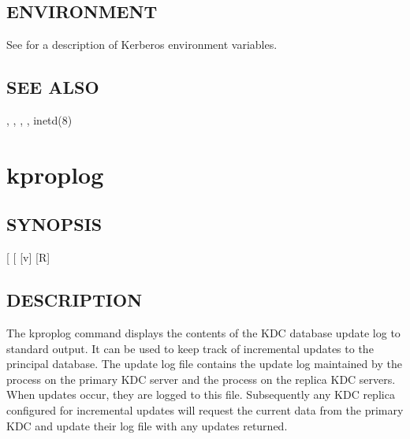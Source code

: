 \documentclass[letterpaper,10pt,english]{sphinxmanual}
\begin{document}
\subsection{ENVIRONMENT}
\label{\detokenize{admin/admin_commands/kpropd:environment}}
\sphinxAtStartPar
See  for a description of Kerberos environment
variables.


\subsection{SEE ALSO}
\label{\detokenize{admin/admin_commands/kpropd:see-also}}
\sphinxAtStartPar
{\hyperref[\detokenize{admin/admin_commands/kprop:kprop-8}]{}}, {\hyperref[\detokenize{admin/admin_commands/kdb5_util:kdb5-util-8}]{}}, {\hyperref[\detokenize{admin/admin_commands/krb5kdc:krb5kdc-8}]{}},
, inetd(8)


\section{kproplog}
\label{\detokenize{admin/admin_commands/kproplog:kproplog}}\label{\detokenize{admin/admin_commands/kproplog:kproplog-8}}\label{\detokenize{admin/admin_commands/kproplog::doc}}

\subsection{SYNOPSIS}
\label{\detokenize{admin/admin_commands/kproplog:synopsis}}
\sphinxAtStartPar
{} {[}\sphinxstylestrong{\sphinxhyphen{}h}{]} {[} \sphinxstyleemphasis{num}{]} {[}\sphinxhyphen{}v{]}
 {[}\sphinxhyphen{}R{]}


\subsection{DESCRIPTION}
\label{\detokenize{admin/admin_commands/kproplog:description}}
\sphinxAtStartPar
The kproplog command displays the contents of the KDC database update
log to standard output.  It can be used to keep track of incremental
updates to the principal database.  The update log file contains the
update log maintained by the {\hyperref[\detokenize{admin/admin_commands/kadmind:kadmind-8}]{}} process on the primary
KDC server and the {\hyperref[\detokenize{admin/admin_commands/kpropd:kpropd-8}]{}} process on the replica KDC
servers.  When updates occur, they are logged to this file.
Subsequently any KDC replica configured for incremental updates will
request the current data from the primary KDC and update their log
file with any updates returned.
\end{document}
